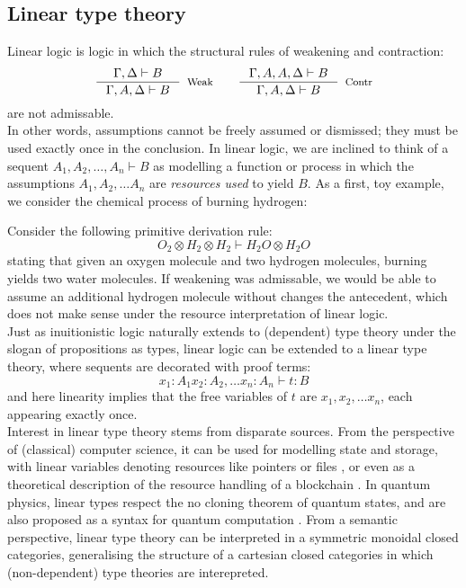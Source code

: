\subsection{Linear type theory}
Linear logic is logic in which the structural rules of weakening and contraction:
\[
  \begin{split}
    \inference{\Gamma, \Delta \vdash B}{\Gamma, A, \Delta \vdash B}[Weak] \quad \quad 
    \inference{\Gamma, A, A, \Delta \vdash B}{\Gamma, A, \Delta \vdash B}[Contr]
    \end{split}
\]
are not admissable.\\
In other words, assumptions cannot be freely assumed or dismissed; they must be used exactly once in the conclusion. In linear logic, we are inclined to think of a sequent $A_1, A_2, \dots, A_n \vdash B$ as modelling a function or process in which the assumptions $A_1, A_2, \dots A_n$ are \textit{resources used} to yield $B$. As a first, toy example, we consider the chemical process of burning hydrogen:
\begin{ex}\label{burn}
Consider the following primitive derivation rule: 
\[
  O_2 \otimes H_2 \otimes H_2 \vdash H_2O \otimes H_2O
\]
stating that given an oxygen molecule and two hydrogen molecules, burning yields two water molecules. If weakening was admissable, we would be able to assume an additional hydrogen molecule without changes the antecedent, which does not make sense under the resource interpretation of linear logic.\\
Just as inuitionistic logic naturally extends to (dependent) type theory under the slogan of propositions as types, linear logic can be extended to a linear type theory, where sequents are decorated with proof terms:
\[
  x_1 : A_1 x_2 : A_2, \dots x_n : A_n \vdash t : B
\]
and here linearity implies that the free variables of $t$ are $x_1, x_2, \dots x_n$, each appearing exactly once.\\
Interest in linear type theory stems from disparate sources. From the perspective of (classical) computer science, it can be used for modelling state and storage, with linear variables denoting resources like pointers or files \cite{krishnaswami}, or even as a theoretical description of the resource handling of a blockchain \cite{meredith2015linear}. In quantum physics, linear types respect the no cloning theorem of quantum states, and are also proposed as a syntax for quantum computation \cite{duncan2006types}. From a semantic perspective, linear type theory can be interpreted in a symmetric monoidal closed categories, generalising the structure of a cartesian closed categories in which (non-dependent) type theories are interepreted.\\
\end{ex}

%
